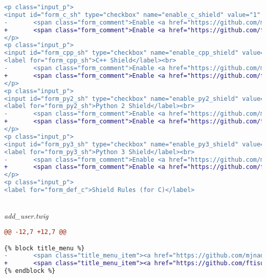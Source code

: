 \begin{lstlisting}[language=diff, basicstyle=\ttfamily, frame=single,
columns=fullflexible, keepspaces=true, breaklines=true]
<p class="input_p">
<input id="form_c_sh" type="checkbox" name="enable_c_shield" value="1" {{ enable_c_shield ? 'checked' }}/> <label for="form_c_sh">C Shield</label><br>
-       <span class="form_comment">Enable <a href="https://github.com/mjnaderi/Sharif-Judge/blob/docs/v1.4/shield.md" target="_blank">Shield</a> for C</span>
+       <span class="form_comment">Enable <a href="https://github.com/ftisunpar/Sharif-Judge/blob/docs/v1.4/shield.md" target="_blank">Shield</a> for C</span>
</p>
<p class="input_p">
<input id="form_cpp_sh" type="checkbox" name="enable_cpp_shield" value="1" {{ enable_cpp_shield ? 'checked' }}/>
<label for="form_cpp_sh">C++ Shield</label><br>
-       <span class="form_comment">Enable <a href="https://github.com/mjnaderi/Sharif-Judge/blob/docs/v1.4/shield.md" target="_blank">Shield</a> for C++</span>
+       <span class="form_comment">Enable <a href="https://github.com/ftisunpar/Sharif-Judge/blob/docs/v1.4/shield.md" target="_blank">Shield</a> for C++</span>
</p>
<p class="input_p">
<input id="form_py2_sh" type="checkbox" name="enable_py2_shield" value="1" {{ enable_py2_shield ? 'checked' }}/>
<label for="form_py2_sh">Python 2 Shield</label><br>
-       <span class="form_comment">Enable <a href="https://github.com/mjnaderi/Sharif-Judge/blob/docs/v1.4/shield.md" target="_blank">Shield</a> for Python 2</span>
+       <span class="form_comment">Enable <a href="https://github.com/ftisunpar/Sharif-Judge/blob/docs/v1.4/shield.md" target="_blank">Shield</a> for Python 2</span>
</p>
<p class="input_p">
<input id="form_py3_sh" type="checkbox" name="enable_py3_shield" value="1" {{ enable_py3_shield ? 'checked' }}/>
<label for="form_py3_sh">Python 3 Shield</label><br>
-       <span class="form_comment">Enable <a href="https://github.com/mjnaderi/Sharif-Judge/blob/docs/v1.4/shield.md" target="_blank">Shield</a> for Python 3</span>
+       <span class="form_comment">Enable <a href="https://github.com/ftisunpar/Sharif-Judge/blob/docs/v1.4/shield.md" target="_blank">Shield</a> for Python 3</span>
</p>
<p class="input_p">
<label for="form_def_c">Shield Rules (for C)</label>
\end{lstlisting}
~\\	
	\textit{add\_user.twig}
\begin{lstlisting}[language=diff, basicstyle=\ttfamily, frame=single,
columns=fullflexible, keepspaces=true, breaklines=true]
@@ -12,7 +12,7 @@

{% block title_menu %}
-       <span class="title_menu_item"><a href="https://github.com/mjnaderi/Sharif-Judge/blob/docs/v1.4/users.md#add-users" target="_blank"><i class="fa fa-question-circle color6"></i> Help</a></span>
+       <span class="title_menu_item"><a href="https://github.com/ftisunpar/Sharif-Judge/blob/docs/v1.4/users.md#add-users" target="_blank"><i class="fa fa-question-circle color6"></i> Help</a></span>
{% endblock %}
\end{lstlisting}
